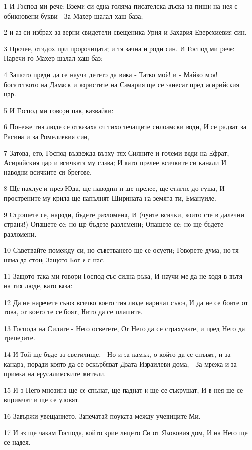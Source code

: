 \par 1 И Господ ми рече: Вземи си една голяма писателска дъска та пиши на нея с обикновени букви - За Махер-шалал-хаш-база;
\par 2 и аз си избрах за верни свидетели свещеника Урия и Захария Еверехиевия син.
\par 3 Прочее, отидох при пророчицата; и тя зачна и роди син. И Господ ми рече: Наречи го Махер-шалал-хаш-баз;
\par 4 Защото преди да се научи детето да вика - Татко мой! и - Майко моя! богатството на Дамаск и користите на Самария ще се занесат пред асирийския цар.
\par 5 И Господ ми говори пак, казвайки:
\par 6 Понеже тия люде се отказаха от тихо течащите силоамски води, И се радват за Расина и за Ромелиевия син,
\par 7 Затова, ето, Господ възвежда върху тях Силните и големи води на Ефрат, Асирийския цар и всичката му слава; И като прелее всичките си канали И наводни всичките си брегове,
\par 8 Ще нахлуе и през Юда, ще наводни и ще прелее, ще стигне до гуша, И прострените му крила ще напълнят Ширината на земята ти, Емануиле.
\par 9 Строшете се, народи, бъдете разломени, И (чуйте всички, които сте в далечни страни!) Опашете се; но ще бъдете разломени; Опашете се; но ще бъдете разломени.
\par 10 Съветвайте помежду си, но съветването ще се осуети; Говорете дума, но тя няма да стои; Защото Бог е с нас.
\par 11 Защото така ми говори Господ със силна ръка, И научи ме да не ходя в пътя на тия люде, като каза:
\par 12 Да не наречете съюз всичко което тия люде наричат съюз, И да не се боите от това, от което те се боят, Нито да се плашите.
\par 13 Господа на Силите - Него осветете, От Него да се страхувате, и пред Него да треперите.
\par 14 И Той ще бъде за светилище, - Но и за камък, о който да се спъват, и за канара, поради която да се оскърбяват Двата Израилеви дома, - За мрежа и за примка на ерусалимските жители.
\par 15 И о Него мнозина ще се спънат, ще паднат и ще се съкрушат, И в нея ще се впримчат и ще се уловят.
\par 16 Завържи увещанието, Запечатай поуката между учениците Ми.
\par 17 И аз ще чакам Господа, който крие лицето Си от Якововия дом, И на Него ще се надея.
